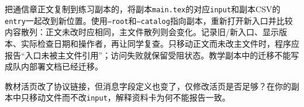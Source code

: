 \begin{example}[在练习副本完成一次入口迁移]
把通信章正文复制到练习副本的，将副本\texttt{main.tex}的对应\texttt{input}和副本CSV的\texttt{entry}一起改到新位置。使用\texttt{--root}和\texttt{--catalog}指向副本，重新打开新入口并比较内容散列：正文未改时应相同，主文件散列则会变化。记录旧/新入口、显示版本、实际检查日期和操作者，再让同学复查。只移动正文而未改主文件时，程序应报告“入口未被主文件引用”；访问失败就保留受阻状态。教学副本中的迁移不能写成队内部署文档已经迁移。
\end{example}

\begin{exercise}
\label{v3-ex-index-4}
教材活页改了协议链接，但消息字段定义也变了，仅修改活页是否足够？在你的副本中只移动文件而不改\texttt{input}，解释资料卡为何不能报告一致。
\end{exercise}
